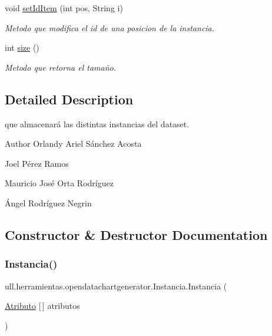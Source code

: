 \begin{DoxyCompactItemize}
void \mbox{\hyperlink{classull_1_1herramientas_1_1opendatachartgenerator_1_1_instancia_a8716fb88c5727ce20611efefa4e785af}{set\+Id\+Item}} (int pos, String i)
\begin{DoxyCompactList}\small\item\em Metodo que modifica el id de una posicion de la instancia. \end{DoxyCompactList}\item 
int \mbox{\hyperlink{classull_1_1herramientas_1_1opendatachartgenerator_1_1_instancia_a6b61e0eca004993c4243245c0e8ba4e4}{size}} ()
\begin{DoxyCompactList}\small\item\em Metodo que retorna el tamaño. \end{DoxyCompactList}\end{DoxyCompactItemize}


\subsection{Detailed Description}
que almacenará las distintas instancias del dataset.

\begin{DoxyAuthor}{Author}
Orlandy Ariel Sánchez Acosta 

Joel Pérez Ramos 

Mauricio José Orta Rodríguez 

Ángel Rodríguez Negrin 
\end{DoxyAuthor}


\subsection{Constructor \& Destructor Documentation}
\mbox{\label{classull_1_1herramientas_1_1opendatachartgenerator_1_1_instancia_a4dc5497b8b8bdb2d15540529ace77487}} 
\subsubsection{\texorpdfstring{Instancia()}{Instancia()}}
{\footnotesize\ttfamily ull.\+herramientas.\+opendatachartgenerator.\+Instancia.\+Instancia (\begin{DoxyParamCaption}\item[{\mbox{\hyperlink{classull_1_1herramientas_1_1opendatachartgenerator_1_1_atributo}{Atributo}} \mbox{[}$\,$\mbox{]}}]{atributos }\end{DoxyParamCaption})}



